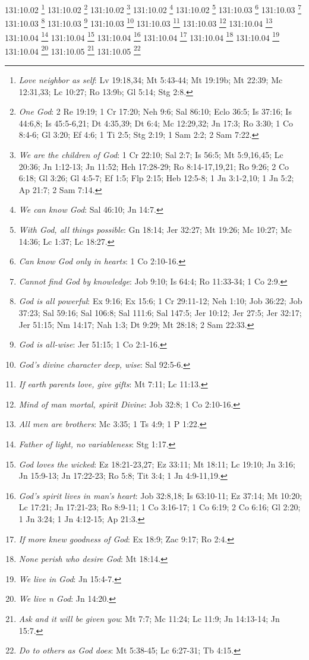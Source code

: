 {{{{{{{{{{{131:10.02 \footnote{\textit{Love neighbor as self}: Lv 19:18,34; Mt 5:43-44; Mt 19:19b; Mt 22:39; Mc 12:31,33; Lc 10:27; Ro 13:9b; Gl 5:14; Stg 2:8.}
131:10.02 \footnote{\textit{One God}: 2 Re 19:19; 1 Cr 17:20; Neh 9:6; Sal 86:10; Eclo 36:5; Is 37:16; Is 44:6,8; Is 45:5-6,21; Dt 4:35,39; Dt 6:4; Mc 12:29,32; Jn 17:3; Ro 3:30; 1 Co 8:4-6; Gl 3:20; Ef 4:6; 1 Ti 2:5; Stg 2:19; 1 Sam 2:2; 2 Sam 7:22.}
131:10.02 \footnote{\textit{We are the children of God}: 1 Cr 22:10; Sal 2:7; Is 56:5; Mt 5:9,16,45; Lc 20:36; Jn 1:12-13; Jn 11:52; Hch 17:28-29; Ro 8:14-17,19,21; Ro 9:26; 2 Co 6:18; Gl 3:26; Gl 4:5-7; Ef 1:5; Flp 2:15; Heb 12:5-8; 1 Jn 3:1-2,10; 1 Jn 5:2; Ap 21:7; 2 Sam 7:14.}
131:10.02 \footnote{\textit{We can know God}: Sal 46:10; Jn 14:7.}
131:10.02 \footnote{\textit{With God, all things possible}: Gn 18:14; Jer 32:27; Mt 19:26; Mc 10:27; Mc 14:36; Lc 1:37; Lc 18:27.}
131:10.03 \footnote{\textit{Can know God only in hearts}: 1 Co 2:10-16.}
131:10.03 \footnote{\textit{Cannot find God by knowledge}: Job 9:10; Is 64:4; Ro 11:33-34; 1 Co 2:9.}
131:10.03 \footnote{\textit{God is all powerful}: Ex 9:16; Ex 15:6; 1 Cr 29:11-12; Neh 1:10; Job 36:22; Job 37:23; Sal 59:16; Sal 106:8; Sal 111:6; Sal 147:5; Jer 10:12; Jer 27:5; Jer 32:17; Jer 51:15; Nm 14:17; Nah 1:3; Dt 9:29; Mt 28:18; 2 Sam 22:33.}
131:10.03 \footnote{\textit{God is all-wise}: Jer 51:15; 1 Co 2:1-16.}
131:10.03 \footnote{\textit{God's divine character deep, wise}: Sal 92:5-6.}
131:10.03 \footnote{\textit{If earth parents love, give gifts}: Mt 7:11; Lc 11:13.}
131:10.03 \footnote{\textit{Mind of man mortal, spirit Divine}: Job 32:8; 1 Co 2:10-16.}
131:10.04 \footnote{\textit{All men are brothers}: Mc 3:35; 1 Ts 4:9; 1 P 1:22.}
131:10.04 \footnote{\textit{Father of light, no variableness}: Stg 1:17.}
131:10.04 \footnote{\textit{God loves the wicked}: Ez 18:21-23,27; Ez 33:11; Mt 18:11; Lc 19:10; Jn 3:16; Jn 15:9-13; Jn 17:22-23; Ro 5:8; Tit 3:4; 1 Jn 4:9-11,19.}
131:10.04 \footnote{\textit{God's spirit lives in man's heart}: Job 32:8,18; Is 63:10-11; Ez 37:14; Mt 10:20; Lc 17:21; Jn 17:21-23; Ro 8:9-11; 1 Co 3:16-17; 1 Co 6:19; 2 Co 6:16; Gl 2:20; 1 Jn 3:24; 1 Jn 4:12-15; Ap 21:3.}
131:10.04 \footnote{\textit{If more knew goodness of God}: Ex 18:9; Zac 9:17; Ro 2:4.}
131:10.04 \footnote{\textit{None perish who desire God}: Mt 18:14.}
131:10.04 \footnote{\textit{We live in God}: Jn 15:4-7.}
131:10.04 \footnote{\textit{We live n God}: Jn 14:20.}
131:10.05 \footnote{\textit{Ask and it will be given you}: Mt 7:7; Mc 11:24; Lc 11:9; Jn 14:13-14; Jn 15:7.}
131:10.05 \footnote{\textit{Do to others as God does}: Mt 5:38-45; Lc 6:27-31; Tb 4:15.}
}}}}}}}}}}}
